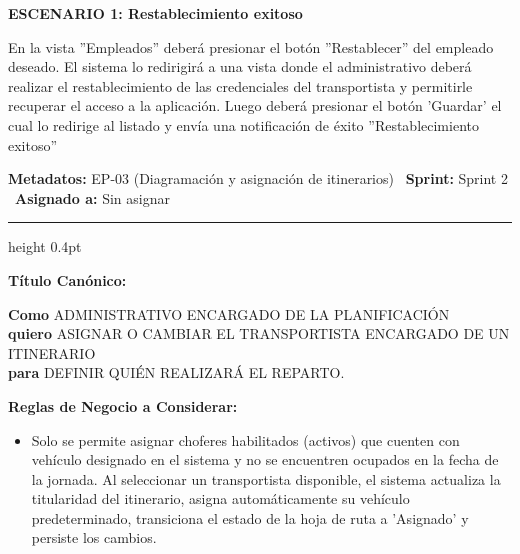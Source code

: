 \documentclass[a4paper,9pt]{article}
\begin{document}
\begin{tcolorbox}
{\footnotesize
\noindent\textbf{\textcolor{secondarydark}{ESCENARIO 1:  Restablecimiento exitoso}}\par\vspace{1pt}
En la vista ''Empleados'' deberá presionar el botón ''Restablecer'' del empleado deseado. El sistema lo redirigirá a una vista donde el administrativo deberá realizar el restablecimiento de las credenciales del transportista y permitirle recuperar el acceso a la aplicación. Luego deberá presionar el botón 'Guardar' el cual lo redirige al listado y envía una notificación de éxito ''Restablecimiento exitoso''\par\vspace{2.5pt}
}\par
\end{tcolorbox}

\begin{tcolorbox}[hucard, title={\textbf{HU-14: ASIGNAR / CAMBIAR TRANSPORTISTA DE UN ITINERARIO} \hfill \scriptsize \colorbox{tealstatus}{\textbf{\ Accepted\ }} \quad \colorbox{white}{\textcolor{primarydark}{\textbf{\ 2 pts\ }}}}]
\vspace{-1pt}
\noindent\textbf{\footnotesize Metadatos:} EP-03 (Diagramación y asignación de itinerarios) \textbar\ \textbf{Sprint:} Sprint 2 \textbar\ \textbf{Asignado a:} Sin asignar\par\vspace{2pt}
\hrule height 0.4pt\par\vspace{3pt}
\noindent\textbf{\footnotesize Título Canónico:}\par\vspace{1pt}
{\small \textbf{Como} ADMINISTRATIVO ENCARGADO DE LA PLANIFICACIÓN \\ \textbf{quiero} ASIGNAR O CAMBIAR EL TRANSPORTISTA ENCARGADO DE UN ITINERARIO \\ \textbf{para} DEFINIR QUIÉN REALIZARÁ EL REPARTO.}\par\vspace{3pt}
\noindent\textbf{\footnotesize Reglas de Negocio a Considerar:}\par\vspace{1pt}
{\footnotesize
\begin{itemize}[leftmargin=12pt, nosep, itemsep=1.5pt, topsep=1pt]
\item Solo se permite asignar choferes habilitados (activos) que cuenten con vehículo designado en el sistema y no se encuentren ocupados en la fecha de la jornada. Al seleccionar un transportista disponible, el sistema actualiza la titularidad del itinerario, asigna automáticamente su vehículo predeterminado, transiciona el estado de la hoja de ruta a 'Asignado' y persiste los cambios.

\end{itemize}}
\end{tcolorbox}
\end{document}
